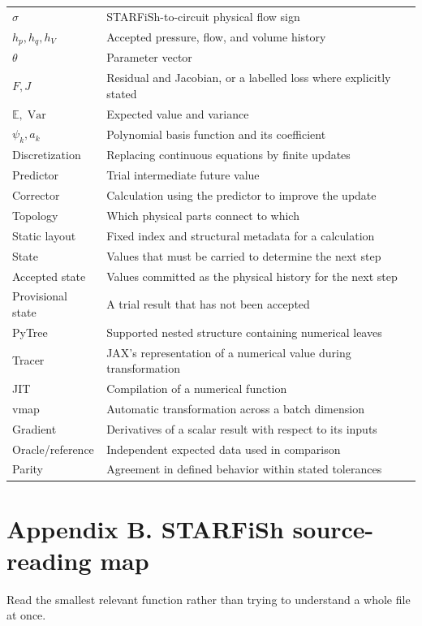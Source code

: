 \documentclass[11pt,a4paper]{article}
\begin{document}
\begin{longtable}{>{\raggedright\arraybackslash}p{}>{\raggedright\arraybackslash}p{}}
\(\sigma\) & STARFiSh-to-circuit physical flow sign \\
\(h_p,h_q,h_V\) & Accepted pressure, flow, and volume history \\
\(\theta\) & Parameter vector \\
\(F,J\) & Residual and Jacobian, or a labelled loss where explicitly stated \\
\(\mathbb E,\operatorname{Var}\) & Expected value and variance \\
\(\psi_k,a_k\) & Polynomial basis function and its coefficient \\
Discretization & Replacing continuous equations by finite updates \\
Predictor & Trial intermediate future value \\
Corrector & Calculation using the predictor to improve the update \\
Topology & Which physical parts connect to which \\
Static layout & Fixed index and structural metadata for a calculation \\
State & Values that must be carried to determine the next step \\
Accepted state & Values committed as the physical history for the next step \\
Provisional state & A trial result that has not been accepted \\
PyTree & Supported nested structure containing numerical leaves \\
Tracer & JAX's representation of a numerical value during transformation \\
JIT & Compilation of a numerical function \\
vmap & Automatic transformation across a batch dimension \\
Gradient & Derivatives of a scalar result with respect to its inputs \\
Oracle/reference & Independent expected data used in comparison \\
Parity & Agreement in defined behavior within stated tolerances \\
\end{longtable}
\endgroup
\clearpage
\section{Appendix B. STARFiSh source-reading map}
Read the smallest relevant function rather than trying to understand a whole file at once.
\end{document}
